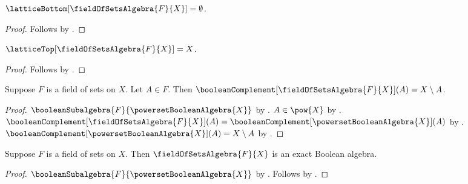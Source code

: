 \begin{proposition}\label{field_of_sets_algebra_bottom}
    $\latticeBottom[\fieldOfSetsAlgebra{F}{X}]=\emptyset$.
\end{proposition}
\begin{proof}
    Follows by
        .
\end{proof}

\begin{proposition}\label{field_of_sets_algebra_top}
    $\latticeTop[\fieldOfSetsAlgebra{F}{X}]=X$.
\end{proposition}
\begin{proof}
    Follows by
        .
\end{proof}

\begin{proposition}\label{field_of_sets_algebra_complement_apply}
    Suppose $F$ is a field of sets on $X$.
    Let $A\in F$.
    Then $\booleanComplement[\fieldOfSetsAlgebra{F}{X}](A)
        =X\setminus A$.
\end{proposition}
\begin{proof}
    $\booleanSubalgebra{F}{\powersetBooleanAlgebra{X}}$ by
        .
    $A\in\pow{X}$ by
        .
    $\booleanComplement[\fieldOfSetsAlgebra{F}{X}](A)
        =\booleanComplement[\powersetBooleanAlgebra{X}](A)$ by
        .
    $\booleanComplement[\powersetBooleanAlgebra{X}](A)
        =X\setminus A$ by
        .
\end{proof}

\begin{theorem}\label{field_of_sets_algebra_is_exact_boolean_algebra}
    Suppose $F$ is a field of sets on $X$.
    Then $\fieldOfSetsAlgebra{F}{X}$ is an exact Boolean algebra.
\end{theorem}
\begin{proof}
    $\booleanSubalgebra{F}{\powersetBooleanAlgebra{X}}$ by
        .
    Follows by
        .
\end{proof}


